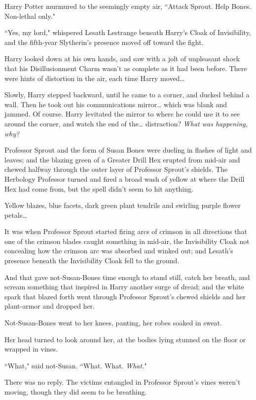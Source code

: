 Harry Potter murmured to the seemingly empty air, ``Attack Sprout. Help Bones. Non-lethal only."

``Yes, my lord," whispered Lesath Lestrange beneath Harry's Cloak of Invisibility, and the fifth-year Slytherin's presence moved off toward the fight.

Harry looked down at his own hands, and saw with a jolt of unpleasant shock that his Disillusionment Charm wasn't as complete as it had been before. There were hints of distortion in the air, each time Harry moved{\ldots}

Slowly, Harry stepped backward, until he came to a corner, and ducked behind a wall. Then he took out his communications mirror{\ldots} which was blank and jammed. Of course. Harry levitated the mirror to where he could use it to see around the corner, and watch the end of the{\ldots} distraction? \emph{What was happening, why?}

Professor Sprout and the form of Susan Bones were dueling in flashes of light and leaves; and the blazing green of a Greater Drill Hex erupted from mid-air and chewed halfway through the outer layer of Professor Sprout's shields. The Herbology Professor turned and fired a broad wash of yellow at where the Drill Hex had come from, but the spell didn't seem to hit anything.

Yellow blazes, blue facets, dark green plant tendrils and swirling purple flower petals{\ldots}

It was when Professor Sprout started firing arcs of crimson in all directions that one of the crimson blades caught something in mid-air, the Invisibility Cloak not concealing how the crimson arc was absorbed and winked out; and Lesath's presence beneath the Invisibility Cloak fell to the ground.

And that gave not-Susan-Bones time enough to stand still, catch her breath, and scream something that inspired in Harry another surge of dread; and the white spark that blazed forth went through Professor Sprout's chewed shields and her plant-armor and dropped her.

Not-Susan-Bones went to her knees, panting, her robes soaked in sweat.

Her head turned to look around her, at the bodies lying stunned on the floor or wrapped in vines.

``What," said not-Susan. ``What. What. \emph{What.}"

There was no reply. The victims entangled in Professor Sprout's vines weren't moving, though they did seem to be breathing.

